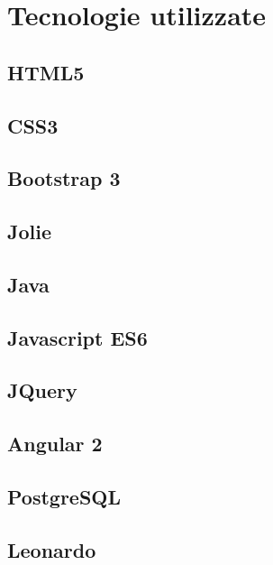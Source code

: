 \newpage
\section{Tecnologie utilizzate}

\subsection{HTML5}

\subsection{CSS3}

\subsection{Bootstrap 3}

\subsection{Jolie}

\subsection{Java}

\subsection{Javascript ES6}

\subsection{JQuery}

\subsection{Angular 2}

\subsection{PostgreSQL}

\subsection{Leonardo}

